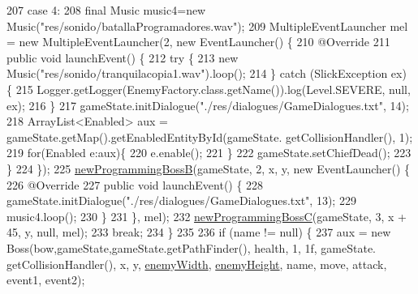 \begin{DoxyCode}
207                 \textcolor{keywordflow}{case} 4:
208                     \textcolor{keyword}{final} Music music4=\textcolor{keyword}{new} Music(\textcolor{stringliteral}{"res/sonido/batallaProgramadores.wav"});
209                     MultipleEventLauncher mel = \textcolor{keyword}{new} MultipleEventLauncher(2, \textcolor{keyword}{new} EventLauncher() \{
210                         @Override
211                         \textcolor{keyword}{public} \textcolor{keywordtype}{void} launchEvent() \{
212                             \textcolor{keywordflow}{try} \{
213                                 \textcolor{keyword}{new} Music(\textcolor{stringliteral}{"res/sonido/tranquilacopia1.wav"}).loop();
214                             \} \textcolor{keywordflow}{catch} (SlickException ex) \{
215                                 Logger.getLogger(EnemyFactory.class.getName()).log(Level.SEVERE, null, ex);
216                             \}
217                             gameState.initDialogue(\textcolor{stringliteral}{"./res/dialogues/GameDialogues.txt"}, 14);
218                             ArrayList<Enabled> aux = gameState.getMap().getEnabledEntityById(gameState.
      getCollisionHandler(), 1);
219                             \textcolor{keywordflow}{for}(Enabled e:aux)\{
220                                 e.enable();
221                             \}
222                             gameState.setChiefDead();
223                         \}
224                     \});
225                     \mbox{\hyperlink{classentities_1_1_enemy_factory_a6f35aad14a67ec068f8a2c555a26a7ee}{newProgrammingBossB}}(gameState, 2, x, y, \textcolor{keyword}{new} EventLauncher() \{
226                         @Override
227                         \textcolor{keyword}{public} \textcolor{keywordtype}{void} launchEvent() \{
228                             gameState.initDialogue(\textcolor{stringliteral}{"./res/dialogues/GameDialogues.txt"}, 13);
229                             music4.loop();
230                         \}
231                     \}, mel);
232                     \mbox{\hyperlink{classentities_1_1_enemy_factory_a7c242d1d38ea0c7aa084b837ec7a77e5}{newProgrammingBossC}}(gameState, 3, x + 45, y, null, mel);
233                     \textcolor{keywordflow}{break};
234             \}
235 
236             \textcolor{keywordflow}{if} (name != null) \{
237                 aux = \textcolor{keyword}{new} Boss(bow,gameState,gameState.getPathFinder(), health, 1, 1f, gameState.
      getCollisionHandler(), x, y, \mbox{\hyperlink{classentities_1_1_enemy_factory_a3396d252fc506310c58e3a32494bbe36}{enemyWidth}}, \mbox{\hyperlink{classentities_1_1_enemy_factory_aa4632fbf138ccc9cc222e7437ccd8284}{enemyHeight}}, name, move, attack, event1, event2);

\end{DoxyCode}
